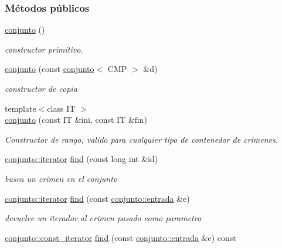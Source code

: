 \subsubsection*{Métodos públicos}
\begin{DoxyCompactItemize}
\item 
\hyperlink{classconjunto_ab634a250097d154d69a13bf8bde9fec7}{conjunto} ()
\begin{DoxyCompactList}\small\item\em constructor primitivo. \end{DoxyCompactList}\item 
\hyperlink{classconjunto_a40c5625e186cfaf7b05c7001f798a1b8}{conjunto} (const \hyperlink{classconjunto}{conjunto}$<$ C\-M\-P $>$ \&d)
\begin{DoxyCompactList}\small\item\em constructor de copia \end{DoxyCompactList}\item 
{\footnotesize template$<$class I\-T $>$ }\\\hyperlink{classconjunto_af1337633f35af4f21f9c3828cef4e546}{conjunto} (const I\-T \&ini, const I\-T \&fin)
\begin{DoxyCompactList}\small\item\em Constructor de rango, valido para cualquier tipo de contenedor de crimenes. \end{DoxyCompactList}\item 
\hyperlink{classconjunto_1_1iterator}{conjunto\-::iterator} \hyperlink{classconjunto_a61a1fbfcfdd54ee08879b0c6c1918f9c}{find} (const long int \&id)
\begin{DoxyCompactList}\small\item\em busca un crimen en el conjunto \end{DoxyCompactList}\item 
\hyperlink{classconjunto_1_1iterator}{conjunto\-::iterator} \hyperlink{classconjunto_a8660fe80847a790eadfaf5df100d4f14}{find} (const \hyperlink{classconjunto_a7630ace7cb17bcec07daf5804f1a0780}{conjunto\-::entrada} \&e)
\begin{DoxyCompactList}\small\item\em devuelve un iterador al crimen pasado como parametro \end{DoxyCompactList}\item 
\hyperlink{classconjunto_1_1const__iterator}{conjunto\-::const\-\_\-iterator} \hyperlink{classconjunto_a8ab0a24d9ea9a59fc2718f3d6e21546a}{find} (const \hyperlink{classconjunto_a7630ace7cb17bcec07daf5804f1a0780}{conjunto\-::entrada} \&e) const 

\end{DoxyCompactItemize}
